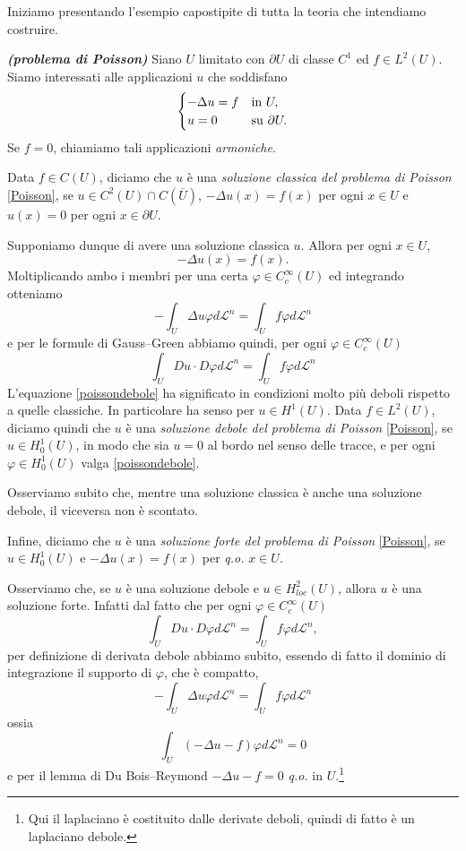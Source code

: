 Iniziamo presentando l'esempio capostipite di tutta la teoria che intendiamo costruire.
\begin{esempio}\textbf{\emph{(problema di Poisson)}}\label{esempiopoisson}
	Siano $U$ limitato con $\partial U$ di classe $C^1$ ed $f \in L^2(U)$. Siamo interessati alle applicazioni $u$ che soddisfano 
	\begin{equation}\label{Poisson}
		\begin{cases}
			-\Delta u = f & \textup{in } U,\\
			u= 0 & \textup{su } \partial U.
		\end{cases}
	\end{equation}
	Se $f = 0$, chiamiamo tali applicazioni \emph{armoniche}.
	
	Data $f \in C(U)$, diciamo che $u$ è una \emph{soluzione classica del problema di Poisson} \eqref{Poisson}, se $u \in C^2(U)\cap C(\overline{U})$, $-\Delta u(x) = f(x)$ per ogni $x \in U$ e $u(x) = 0$ per ogni $x \in \partial U$. 
	
	Supponiamo dunque di avere una soluzione classica $u$. Allora per ogni $x \in U$,
	\[ -\Delta u(x) = f(x). \]
	Moltiplicando ambo i membri per una certa $\varphi \in C^\infty_c(U)$ ed integrando otteniamo 
	\[ -\int_U\Delta u \varphi d\mathcal{L}^n = \int_U f \varphi d\mathcal{L}^n \] 
	e per le formule di Gauss--Green abbiamo quindi, per ogni $\varphi \in C^\infty_c(U)$
	\begin{equation}\label{poissondebole}
		\int_U Du \cdot D\varphi d\mathcal{L}^n = \int_U f \varphi d\mathcal{L}^n
	\end{equation}
	L'equazione \eqref{poissondebole} ha significato in condizioni molto più deboli rispetto a quelle classiche. In particolare ha senso per $u \in H^1(U)$. Data $f \in L^2(U)$, diciamo quindi che $u$ è una \emph{soluzione debole del problema di Poisson} \eqref{Poisson}, se $u \in H^{1}_0(U)$, in modo che sia $u=0$ al bordo nel senso delle tracce, e per ogni $\varphi \in H^{1}_0(U)$ valga \eqref{poissondebole}. 
	
	Osserviamo subito che, mentre una soluzione classica è anche una soluzione debole, il viceversa non è scontato.
	
	Infine, diciamo che $u$ è una \emph{soluzione forte del problema di Poisson} \eqref{Poisson}, se $u \in H^{1}_0(U)$ e $-\Delta u(x) = f(x)$ per \emph{q.o.} $x \in U$.
	
	Osserviamo che, se $u$ è una soluzione debole e $u \in H^2_{loc}(U)$, allora $u$ è una soluzione forte. Infatti dal fatto che per ogni $\varphi \in C^\infty_c(U)$
	\[ \int_U Du \cdot D\varphi d\mathcal{L}^n = \int_U f \varphi d\mathcal{L}^n, \]
	per definizione di derivata debole abbiamo subito, essendo di fatto il dominio di integrazione il supporto di $\varphi$, che è compatto,
	\[ -\int_U \Delta u \varphi d\mathcal{L}^n = \int_U f \varphi d\mathcal{L}^n\]
	ossia 
	\[ \int_U (-\Delta u - f)\varphi d\mathcal{L}^n = 0\]
	e per il lemma di Du Bois--Reymond $-\Delta u - f= 0$ \emph{q.o.} in $U$.\footnote{Qui il laplaciano è costituito dalle derivate deboli, quindi di fatto è un laplaciano debole.} 
\end{esempio}

